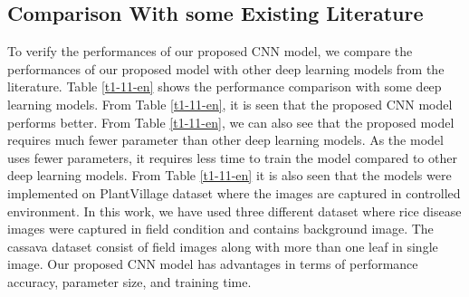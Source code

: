 \subsection{Comparison With some Existing Literature}
To verify the performances of our proposed CNN model, we compare the performances of our proposed model with other deep learning models from the literature. Table \ref{t1-11-en} shows the performance comparison with some deep learning models. From Table \ref{t1-11-en}, it is seen that the proposed CNN model performs better. From Table \ref{t1-11-en}, we can also see that the proposed model requires much fewer parameter than other deep learning models. As the model uses fewer parameters, it requires less time to train the model compared to other deep learning models. From Table \ref{t1-11-en} it is also seen that the models were implemented on PlantVillage dataset where the images are captured in controlled environment. In this work, we have used three different dataset where rice disease images were captured in field condition and contains background image. The cassava dataset consist of field images along with more than one leaf in single image. Our proposed CNN model has advantages in terms of performance accuracy, parameter size, and training time.


